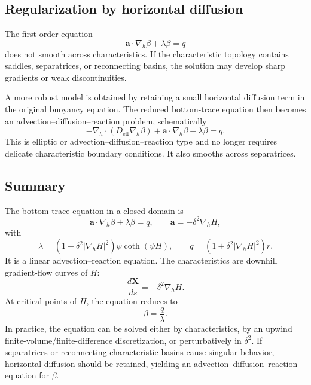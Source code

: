 \documentclass[11pt]{amsart}
\begin{document}
\subsection{Regularization by horizontal diffusion}

The first-order equation
\[
\mathbf{a}\cdot\nabla_h\beta+\lambda\beta=q
\]
does not smooth across characteristics. If the characteristic topology contains
saddles, separatrices, or reconnecting basins, the solution may develop sharp
gradients or weak discontinuities.

A more robust model is obtained by retaining a small horizontal diffusion term
in the original buoyancy equation. The reduced bottom-trace equation then becomes
an advection--diffusion--reaction problem, schematically
\[
-\nabla_h\cdot(D_{\mathrm{eff}}\nabla_h\beta)
+
\mathbf{a}\cdot\nabla_h\beta
+
\lambda\beta
=
q.
\]
This is elliptic or advection--diffusion--reaction type and no longer requires
delicate characteristic boundary conditions. It also smooths across separatrices.

\subsection{Summary}

The bottom-trace equation in a closed domain is
\[
\boxed{
\mathbf{a}\cdot\nabla_h\beta+\lambda\beta=q,
\qquad
\mathbf{a}=-\delta^2\nabla_h H,
}
\]
with
\[
\lambda=
\left(1+\delta^2|\nabla_h H|^2\right)\psi\coth(\psi H),
\qquad
q=
\left(1+\delta^2|\nabla_h H|^2\right)r.
\]
It is a linear advection--reaction equation. The characteristics are downhill
gradient-flow curves of \(H\):
\[
\frac{d\mathbf{X}}{ds}=-\delta^2\nabla_h H.
\]
At critical points of \(H\), the equation reduces to
\[
\beta=\frac{q}{\lambda}.
\]
In practice, the equation can be solved either by characteristics, by an upwind
finite-volume/finite-difference discretization, or perturbatively in
\(\delta^2\). If separatrices or reconnecting characteristic basins cause
singular behavior, horizontal diffusion should be retained, yielding an
advection--diffusion--reaction equation for \(\beta\).
\end{document}
